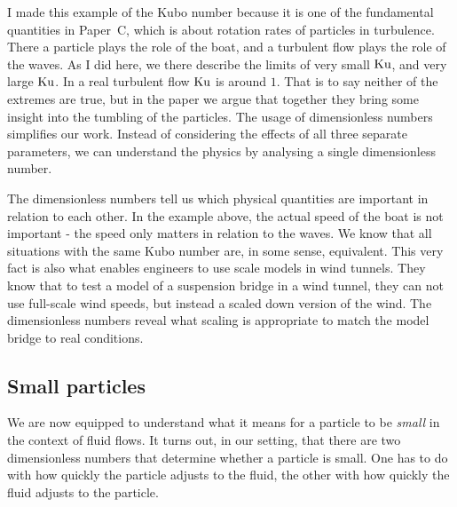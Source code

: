 \documentclass[thesis.tex]{subfiles}
\begin{document}
I made this example of the Kubo number because it is one of the fundamental quantities in Paper~C, which is about rotation rates of particles in turbulence. There a particle plays the role of the boat, and a turbulent flow plays the role of the waves. As I did here, we there describe the limits of very small $\mbox{Ku}$, and very large $\mbox{Ku}$. In a real turbulent flow $\mbox{Ku}$ is around $1$. That is to say neither of the extremes are true, but in the paper we argue that together they bring some insight into the tumbling of the particles. The usage of dimensionless numbers simplifies our work. Instead of considering the effects of all three separate parameters, we can understand the physics by analysing a single dimensionless number.

The dimensionless numbers tell us which physical quantities are important in relation to each other. In the example above, the actual speed of the boat is not important - the speed only matters in relation to the waves. We know that all situations with the same Kubo number are, in some sense, equivalent. This very fact is also what enables engineers to use scale models in wind tunnels. They know that to test a model of a suspension bridge in a wind tunnel, they can not use full-scale wind speeds, but instead a scaled down version of the wind. The dimensionless numbers reveal what scaling is appropriate to match the model bridge to real conditions.

\subsection*{Small particles}

We are now equipped to understand what it means for a particle to be \emph{small} in the context of fluid flows. It turns out, in our setting, that there are two dimensionless numbers that determine whether a particle is small. One has to do with how quickly the particle adjusts to the fluid, the other with how quickly the fluid adjusts to the particle.
\end{document}
